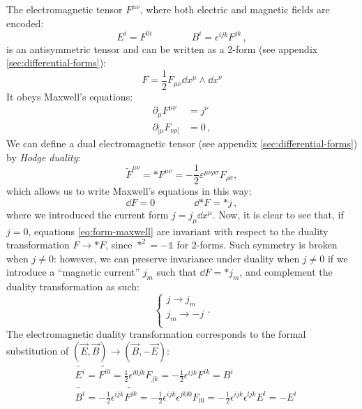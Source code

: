 \documentclass[main.tex]{subfiles}
\begin{document}
The electromagnetic tensor $F^{\mu \nu}$, where both electric and magnetic fields are encoded:
%
\begin{equation}
E^i=F^{0i} \qquad \qquad B^i=\epsilon^{ijk}F^{jk}\,,
\end{equation}
%
is an antisymmetric tensor and can be written as a 2-form (see appendix \ref{sec:differential-forms}): 
%
\begin{equation}
F = \frac{1}{2} F_{\mu\nu}\dd{x^\mu} \wedge \dd{x^\nu}
\end{equation}
%
It obeys Maxwell's equations:
%
\begin{subequations} \label{Maxwell}
\begin{align}
\partial_{\mu}F^{\mu \nu}&= j^\nu \label{maxwell-nonhom} \\
\partial_{[\mu} F_{\nu\rho]} &=0 \label{maxwell-hom} \,,
\end{align}
\end{subequations}
We can define a dual electromagnetic tensor (see appendix \ref{sec:differential-forms}) by \emph{Hodge duality}: 
\begin{equation}
\tilde{F}^{\mu\nu}=*F^{\mu\nu}=-\frac{1}{2}\varepsilon^{\mu \nu \rho \sigma}F_{\rho \sigma},
\end{equation}
%
%
which allows us to write Maxwell's equations in this way: 
%
\begin{equation} \label{eq:form-maxwell}
    \dd{F} = 0 \qquad  \qquad \dd{*F} = * j\,,
\end{equation}
%
where we introduced the current form $j = j_\mu \dd{x^\mu}$.
%
Now, it is clear to see that, if $j=0$, equations \ref{eq:form-maxwell} are invariant with respect to the duality transformation $F \rightarrow *F$, since $*^2 = -\mathbb{1}$ for 2-forms. Such symmetry is broken when $j\neq 0$: however, we can preserve invariance under duality when $j\neq 0$ if we introduce a ``magnetic current'' $j_m$ such that $\dd{F} = *j_m$, and complement the duality transformation as such:
\begin{equation}
\begin{cases}
j \rightarrow j_m \\
j_m \rightarrow -j \\
\end{cases}.
\end{equation}
%
The electromagnetic duality transformation corresponds to the formal substitution of $(\vec E,\vec B)\to(\vec B,-\vec E)$:
%
\begin{subequations}
\begin{align}
&\tilde{E^i}=\tilde{F^{i0}}=\frac{1}{2}\epsilon^{i0jk}F_{jk}=-\frac{1}{2}\epsilon^{ijk}F^{ik}=B^i\\
&\tilde{B^i}=-\frac{1}{2}\epsilon^{ijk}\tilde{F^{jk}}=-\frac{1}{2}\epsilon^{ijk}\epsilon^{jkl0}F_{l0}=-\frac{1}{2}\epsilon^{ijk}\epsilon^{ljk}E^l=-E^i
\end{align}
\end{subequations}
\end{document}
